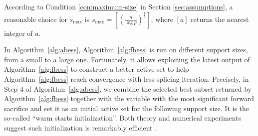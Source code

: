\begin{remark}
According to Condition \ref{con:maximum-size} in Section \ref{sec:assumptions}, a reasonable choice for $s_{\max}$ is $s_{\max} = [(\frac{{n}}{\log p})^{\frac{1}{4}}]$, where $[a]$ returns the nearest integer of $a$.
\end{remark}
\begin{remark}
In Algorithm~\ref{alg:abess}, Algorithm~\ref{alg:fbess} is run on different support sizes, from a small to a large one. Fortunately, it allows exploiting the latest output of Algorithm~\ref{alg:fbess} to construct a better active set to help Algorithm~\ref{alg:fbess} reach convergence with less splicing iteration. Precisely, in Step 4 of Algorithm~\ref{alg:abess}, we combine the selected best subset returned by Algorithm~\ref{alg:fbess} together with the variable with the most significant forward sacrifice and set it as an initial active set for the following support size. It is the so-called ``warm starts initialization''. Both theory and numerical experiments suggest such initialization is remarkably efficient \citep{barutConditionalSureIndependence2016, friedman2010regularization}.
\end{remark}
